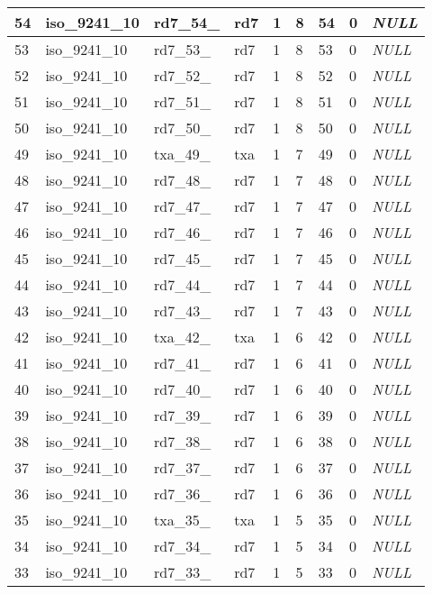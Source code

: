 \begin{longtable}{|l|l|l|l|l|l|l|l|l|}
54 & iso\_9241\_10 & rd7\_54\_ & rd7 & 1 & 8 & 54 & 0 & \textit{NULL} \\ \hline 
53 & iso\_9241\_10 & rd7\_53\_ & rd7 & 1 & 8 & 53 & 0 & \textit{NULL} \\ \hline 
52 & iso\_9241\_10 & rd7\_52\_ & rd7 & 1 & 8 & 52 & 0 & \textit{NULL} \\ \hline 
51 & iso\_9241\_10 & rd7\_51\_ & rd7 & 1 & 8 & 51 & 0 & \textit{NULL} \\ \hline 
50 & iso\_9241\_10 & rd7\_50\_ & rd7 & 1 & 8 & 50 & 0 & \textit{NULL} \\ \hline 
49 & iso\_9241\_10 & txa\_49\_ & txa & 1 & 7 & 49 & 0 & \textit{NULL} \\ \hline 
48 & iso\_9241\_10 & rd7\_48\_ & rd7 & 1 & 7 & 48 & 0 & \textit{NULL} \\ \hline 
47 & iso\_9241\_10 & rd7\_47\_ & rd7 & 1 & 7 & 47 & 0 & \textit{NULL} \\ \hline 
46 & iso\_9241\_10 & rd7\_46\_ & rd7 & 1 & 7 & 46 & 0 & \textit{NULL} \\ \hline 
45 & iso\_9241\_10 & rd7\_45\_ & rd7 & 1 & 7 & 45 & 0 & \textit{NULL} \\ \hline 
44 & iso\_9241\_10 & rd7\_44\_ & rd7 & 1 & 7 & 44 & 0 & \textit{NULL} \\ \hline 
43 & iso\_9241\_10 & rd7\_43\_ & rd7 & 1 & 7 & 43 & 0 & \textit{NULL} \\ \hline 
42 & iso\_9241\_10 & txa\_42\_ & txa & 1 & 6 & 42 & 0 & \textit{NULL} \\ \hline 
41 & iso\_9241\_10 & rd7\_41\_ & rd7 & 1 & 6 & 41 & 0 & \textit{NULL} \\ \hline 
40 & iso\_9241\_10 & rd7\_40\_ & rd7 & 1 & 6 & 40 & 0 & \textit{NULL} \\ \hline 
39 & iso\_9241\_10 & rd7\_39\_ & rd7 & 1 & 6 & 39 & 0 & \textit{NULL} \\ \hline 
38 & iso\_9241\_10 & rd7\_38\_ & rd7 & 1 & 6 & 38 & 0 & \textit{NULL} \\ \hline 
37 & iso\_9241\_10 & rd7\_37\_ & rd7 & 1 & 6 & 37 & 0 & \textit{NULL} \\ \hline 
36 & iso\_9241\_10 & rd7\_36\_ & rd7 & 1 & 6 & 36 & 0 & \textit{NULL} \\ \hline 
35 & iso\_9241\_10 & txa\_35\_ & txa & 1 & 5 & 35 & 0 & \textit{NULL} \\ \hline 
34 & iso\_9241\_10 & rd7\_34\_ & rd7 & 1 & 5 & 34 & 0 & \textit{NULL} \\ \hline 
33 & iso\_9241\_10 & rd7\_33\_ & rd7 & 1 & 5 & 33 & 0 & \textit{NULL} \\ \hline 

\end{longtable}
